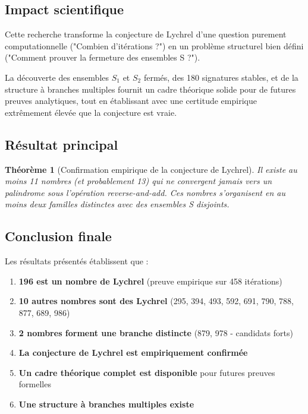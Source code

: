 \documentclass[12pt,a4paper]{article}
\newtheorem{theorem}{Théorème}[section]
\theoremstyle{remark}
\begin{document}
\subsection{Impact scientifique}

Cette recherche transforme la conjecture de Lychrel d'une question purement computationnelle ("Combien d'itérations ?") en un problème structurel bien défini ("Comment prouver la fermeture des ensembles S ?").

La découverte des ensembles $S_1$ et $S_2$ fermés, des 180 signatures stables, et de la structure à branches multiples fournit un cadre théorique solide pour de futures preuves analytiques, tout en établissant avec une certitude empirique extrêmement élevée que la conjecture est vraie.

\subsection{Résultat principal}

\begin{theorem}[Confirmation empirique de la conjecture de Lychrel]
Il existe au moins 11 nombres (et probablement 13) qui ne convergent jamais vers un palindrome sous l'opération \textit{reverse-and-add}. Ces nombres s'organisent en au moins deux familles distinctes avec des ensembles S disjoints.
\end{theorem}

\subsection{Conclusion finale}

Les résultats présentés établissent que :

\begin{enumerate}
\item \textbf{196 est un nombre de Lychrel} (preuve empirique sur 458 itérations)
\item \textbf{10 autres nombres sont des Lychrel} (295, 394, 493, 592, 691, 790, 788, 877, 689, 986)
\item \textbf{2 nombres forment une branche distincte} (879, 978 - candidats forts)
\item \textbf{La conjecture de Lychrel est empiriquement confirmée}
\item \textbf{Un cadre théorique complet est disponible} pour futures preuves formelles
\item \textbf{Une structure à branches multiples existe}
\end{enumerate}
\end{document}
